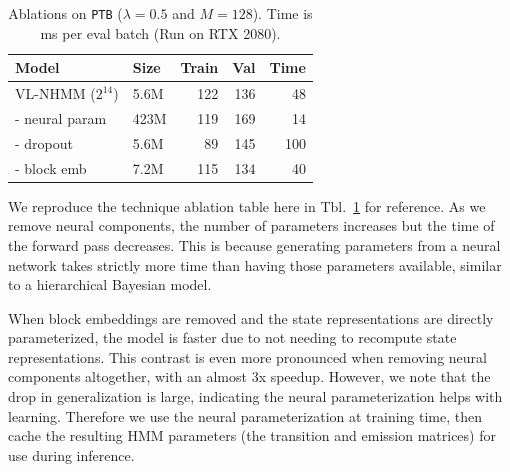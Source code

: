 \documentclass[11pt,a4paper]{article}
\begin{document}
\begin{table}[h]
\centering
\begin{tabular}{llrrr}
\toprule
Model                & Size & Train  & Val & Time \\
\midrule
VL-NHMM ($2^{14}$)   & 5.6M & 122    & 136 & 48\\
\quad - neural param & 423M & 119    & 169 & 14\\
\quad - dropout      & 5.6M & 89     & 145 & 100\\
\quad - block emb    & 7.2M & 115    & 134 & 40\\
\bottomrule
\end{tabular}
\caption{\label{tbl:dropout-param-ablation-repeat}
Ablations on \texttt{PTB} ($\lambda =0.5$ and $M=128$). 
Time is ms per eval batch (Run on RTX 2080).
}
\end{table}

We reproduce the technique ablation table here in
Tbl.~\ref{tbl:dropout-param-ablation-repeat} for reference.
As we remove neural components, 
the number of parameters increases but the time of the
forward pass decreases.
This is because generating parameters from a neural network
takes strictly more time than having those parameters available,
similar to a hierarchical Bayesian model.

When block embeddings are removed and the state representations are
directly parameterized,
the model is faster due to not needing to recompute state representations.
This contrast is even more pronounced when removing neural components altogether,
with an almost 3x speedup.
However, we note that the drop in generalization is large,
indicating the neural parameterization helps with learning.
Therefore we use the neural parameterization at training time,
then cache the resulting HMM parameters (the transition and emission matrices)
for use during inference.
\end{document}
